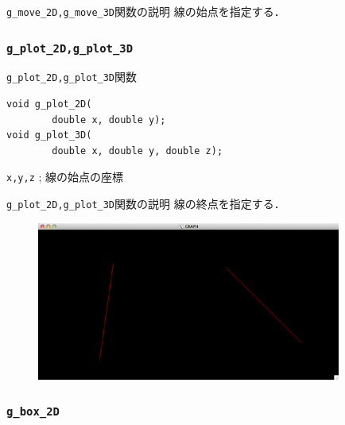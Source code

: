 \documentclass[platex,a4paper,12pt]{jsarticle}%
\begin{document}
\begin{itembox}[l]{\texttt{g\_move\_2D,g\_move\_3D}関数の説明}
線の始点を指定する．
\end{itembox}

\subsubsection{\texttt{g\_plot\_2D,g\_plot\_3D}}

\begin{itembox}[l]{\texttt{g\_plot\_2D,g\_plot\_3D}関数}
\begin{verbatim}
void g_plot_2D(
        double x, double y);
void g_plot_3D(
        double x, double y, double z);     
\end{verbatim}
\verb|x,y,z| ; 線の始点の座標\\
\end{itembox}

\begin{itembox}[l]{\texttt{g\_plot\_2D,g\_plot\_3D}関数の説明}
線の終点を指定する．
\end{itembox}

\begin{figure}[htb]
\centering
\includegraphics[width=100mm]{./Figures/eps/Canvas_g_move_g_plot.eps}
\end{figure}




\clearpage
\subsubsection{\texttt{g\_box\_2D}}
\end{document}
